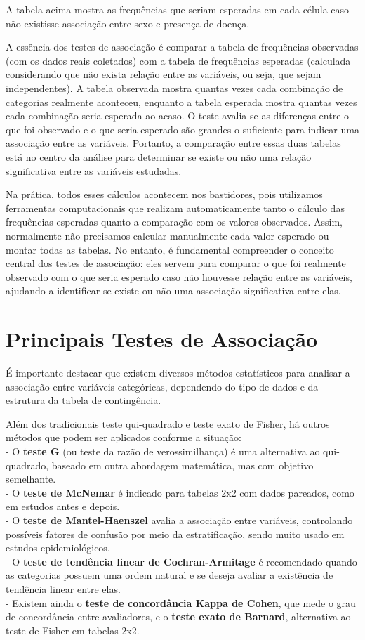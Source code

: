 \documentclass[
]{book}
\begin{document}
A tabela acima mostra as frequências que seriam esperadas em cada célula caso não existisse associação entre sexo e presença de doença.

A essência dos testes de associação é comparar a tabela de frequências observadas (com os dados reais coletados) com a tabela de frequências esperadas (calculada considerando que não exista relação entre as variáveis, ou seja, que sejam independentes). A tabela observada mostra quantas vezes cada combinação de categorias realmente aconteceu, enquanto a tabela esperada mostra quantas vezes cada combinação seria esperada ao acaso. O teste avalia se as diferenças entre o que foi observado e o que seria esperado são grandes o suficiente para indicar uma associação entre as variáveis. Portanto, a comparação entre essas duas tabelas está no centro da análise para determinar se existe ou não uma relação significativa entre as variáveis estudadas.

Na prática, todos esses cálculos acontecem nos bastidores, pois utilizamos ferramentas computacionais que realizam automaticamente tanto o cálculo das frequências esperadas quanto a comparação com os valores observados. Assim, normalmente não precisamos calcular manualmente cada valor esperado ou montar todas as tabelas. No entanto, é fundamental compreender o conceito central dos testes de associação: eles servem para comparar o que foi realmente observado com o que seria esperado caso não houvesse relação entre as variáveis, ajudando a identificar se existe ou não uma associação significativa entre elas.

\section{Principais Testes de Associação}\label{principais-testes-de-associauxe7uxe3o}

É importante destacar que existem diversos métodos estatísticos para analisar a associação entre variáveis categóricas, dependendo do tipo de dados e da estrutura da tabela de contingência.

Além dos tradicionais teste qui-quadrado e teste exato de Fisher, há outros métodos que podem ser aplicados conforme a situação:\\
- O \textbf{teste G} (ou teste da razão de verossimilhança) é uma alternativa ao qui-quadrado, baseado em outra abordagem matemática, mas com objetivo semelhante.\\
- O \textbf{teste de McNemar} é indicado para tabelas 2x2 com dados pareados, como em estudos antes e depois.\\
- O \textbf{teste de Mantel-Haenszel} avalia a associação entre variáveis, controlando possíveis fatores de confusão por meio da estratificação, sendo muito usado em estudos epidemiológicos.\\
- O \textbf{teste de tendência linear de Cochran-Armitage} é recomendado quando as categorias possuem uma ordem natural e se deseja avaliar a existência de tendência linear entre elas.\\
- Existem ainda o \textbf{teste de concordância Kappa de Cohen}, que mede o grau de concordância entre avaliadores, e o \textbf{teste exato de Barnard}, alternativa ao teste de Fisher em tabelas 2x2.
\end{document}
